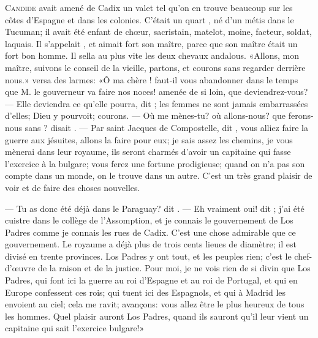 \lettrine{C}{andide} avait amené de Cadix un valet tel qu’on en trouve beaucoup sur
les côtes d’Espagne et dans les colonies. C’était un quart ,
né d’un métis dans le Tucuman; il avait été enfant de chœur,
sacristain, matelot, moine, facteur, soldat, laquais. Il s’appelait
, et aimait fort son maître, parce que son maître était un fort
bon homme. Il sella au plus vite les deux chevaux andalous. «Allons, mon
maître, suivons le conseil de la vieille, partons, et courons sans
regarder derrière nous.»  versa des larmes: «Ô ma chère ! 
faut-il vous abandonner dans le temps que M. le gouverneur va
faire nos noces!  amenée de si loin, que deviendrez-vous? — Elle
deviendra ce qu’elle pourra, dit ; les femmes ne sont jamais
embarrassées d’elles; Dieu y pourvoit; courons. — Où me mènes-tu? où
allons-nous? que ferons-nous sans ? disait . — Par saint
Jacques de Compostelle, dit , vous alliez faire la guerre aux
jésuites, allons la faire pour eux; je sais assez les chemins, je vous
mènerai dans leur royaume, ils seront charmés d’avoir un capitaine qui
fasse l’exercice à la bulgare; vous ferez une fortune prodigieuse;
quand on n’a pas son compte dans un monde, on le trouve dans un autre.
C’est un très grand plaisir de voir et de faire des choses nouvelles.


— Tu as donc été déjà dans le Paraguay? dit . — Eh vraiment oui! dit
; j’ai été cuistre dans le collège de l’Assomption, et je
connais le gouvernement de Los Padres comme je connais les rues de
Cadix. C’est une chose admirable que ce gouvernement. Le royaume a déjà
plus de trois cents lieues de diamètre; il est divisé en trente
provinces. Los Padres y ont tout, et les peuples rien; c’est le
chef-d’œuvre de la raison et de la justice. Pour moi, je ne vois rien
de si divin que Los Padres, qui font ici la guerre au roi d’Espagne et
au roi de Portugal, et qui en Europe confessent ces rois; qui tuent ici
des Espagnols, et qui à Madrid les envoient au ciel; cela me ravit;
avançons: vous allez être le plus heureux de tous les hommes. Quel
plaisir auront Los Padres, quand ils sauront qu’il leur vient un
capitaine qui sait l’exercice bulgare!»



